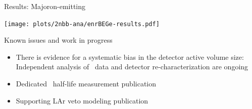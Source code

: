 \documentclass[10pt,aspectratio=169]{beamer}
\begin{document}
\begin{frame}[plain]{Results: Majoron-emitting \texorpdfstring{\onbb}{0nbb}}
  \begin{center}
    \texttt{[image: plots/2nbb-ana/enrBEGe-results.pdf]}
  \end{center}
\end{frame}
\begin{frame}{Known issues and work in progress}
  \begin{itemize}
    \item There is evidence for a systematic bias in the detector active volume
      size: Independent analysis of \Arl\ data and detector re-characterization
      are ongoing
    \item Dedicated \nnbb\ half-life measurement publication
    \item Supporting LAr veto modeling publication
  \end{itemize}
\end{frame}
\end{document}
